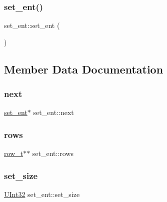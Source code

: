 \subsubsection{\texorpdfstring{set\+\_\+ent()}{set\_ent()}}
{\footnotesize\ttfamily set\+\_\+ent\+::set\+\_\+ent (\begin{DoxyParamCaption}{ }\end{DoxyParamCaption})}



\subsection{Member Data Documentation}
\mbox{\label{classset__ent_a2ae1cbb145d6447f9f61de595eb3a4f4}} 
\subsubsection{\texorpdfstring{next}{next}}
{\footnotesize\ttfamily \hyperlink{classset__ent}{set\+\_\+ent}$\ast$ set\+\_\+ent\+::next}

\mbox{\label{classset__ent_aeef660ee01f805956cc54d9165c8ab44}} 
\subsubsection{\texorpdfstring{rows}{rows}}
{\footnotesize\ttfamily \hyperlink{classrow__t}{row\+\_\+t}$\ast$$\ast$ set\+\_\+ent\+::rows}

\mbox{\label{classset__ent_a56b8c477e32506bada3a073647243c02}} 
\subsubsection{\texorpdfstring{set\+\_\+size}{set\_size}}
{\footnotesize\ttfamily \hyperlink{global_8h_a7e8aeec7b6541935dfc6f608cd5170ce}{U\+Int32} set\+\_\+ent\+::set\+\_\+size}

\mbox{\label{classset__ent_a5b485f5ee58d49e9bb77e965841248d5}} 
